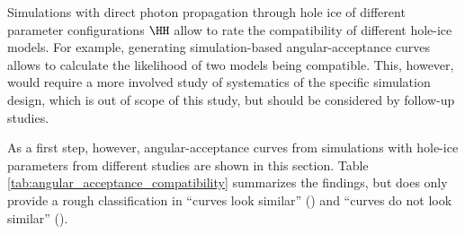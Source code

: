 
\newcommand\ok{\ding{51}} %
\newcommand\same{\cellcolor{black!25}}
\newcommand\greyedout{\cellcolor{black!25}}
\newcommand\bad{\ding{55}}

\newcommand\clsimppc{\noun{clsim+ppc}}

Simulations with direct photon propagation through hole ice of different parameter configurations $\HH$ allow to rate the compatibility of different hole-ice models. For example, generating simulation-based angular-acceptance curves allows to calculate the likelihood of two models being compatible. This, however, would require a more involved study of systematics of the specific simulation design, which is out of scope of this study, but should be considered by follow-up studies.\followup

As a first step, however, angular-acceptance curves from simulations with hole-ice parameters from different studies are shown in this section. Table \ref{tab:angular_acceptance_compatibility} summarizes the findings, but does only provide a rough classification in \enquote{curves look similar} (\ok) and \enquote{curves do not look similar} (\bad).

